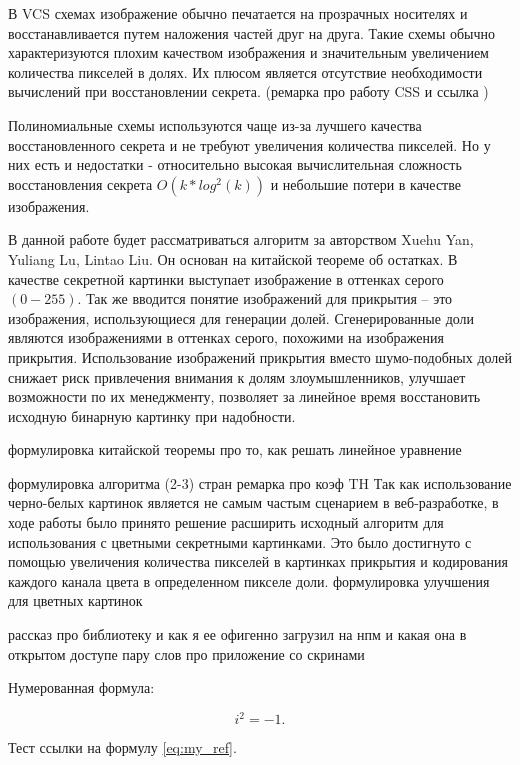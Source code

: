 \documentclass[a4paper,article,14pt]{extarticle}
\begin{document}
В VCS схемах изображение обычно печатается на прозрачных носителях и восстанавливается путем наложения частей друг на друга. Такие 
схемы обычно характеризуются плохим качеством изображения и значительным увеличением количества пикселей в долях. Их плюсом является
отсутствие необходимости вычислений при восстановлении секрета. (ремарка про работу CSS и ссылка )

Полиномиальные схемы используются чаще из-за лучшего качества восстановленного секрета и не требуют увеличения количества пикселей.
Но у них есть и недостатки - относительно высокая вычислительная сложность восстановления секрета $O(k*log^2(k))$ и небольшие потери
в качестве изображения.

В данной работе будет рассматриваться алгоритм за авторством Xuehu Yan, Yuliang Lu, Lintao Liu. Он основан на китайской теореме об 
остатках. В качестве секретной картинки выступает изображение в оттенках серого $(0-255)$.
Так же вводится понятие изображений для прикрытия -- это изображения, использующиеся для генерации долей. Сгенерированные доли 
являются изображениями в оттенках серого, похожими на изображения прикрытия. Использование изображений прикрытия 
вместо шумо-подобных долей снижает риск привлечения внимания к долям злоумышленников, улучшает возможности 
по их менеджменту, позволяет за линейное время восстановить исходную бинарную картинку при надобности. 

формулировка китайской теоремы
про то, как решать линейное уравнение 

формулировка алгоритма (2-3) стран
ремарка про коэф TH
Так как использование черно-белых картинок является не самым частым сценарием в веб-разработке, в ходе работы было принято решение 
расширить исходный алгоритм для использования с цветными секретными картинками. Это было достигнуто с помощью увеличения количества
пикселей в картинках прикрытия и кодирования каждого канала цвета в определенном пикселе доли.
формулировка улучшения для цветных картинок

рассказ про библиотеку и как я ее офигенно загрузил на нпм и какая она в открытом доступе
пару слов про приложение со скринами




Нумерованная формула:

\begin{equation}
    i^2 = -1.
    \label{eq:my_ref}
\end{equation}

Тест ссылки на формулу \ref{eq:my_ref}.
\end{document}
